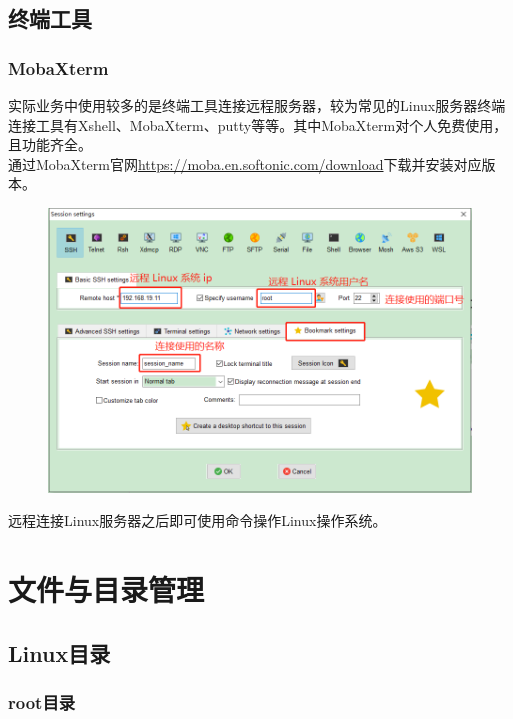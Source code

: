 \documentclass[12pt, openany, oneside]{book}
\begin{document}
\newpage

\section{终端工具}

\subsection{MobaXterm}

实际业务中使用较多的是终端工具连接远程服务器，较为常见的Linux服务器终端连接工具有Xshell、MobaXterm、putty等等。其中MobaXterm对个人免费使用，且功能齐全。\\

通过MobaXterm官网\url{https://moba.en.softonic.com/download}下载并安装对应版本。

\begin{figure}[H]
    \centering
    \includegraphics[scale=0.4]{img/Chapter1/1-5/1.png}
\end{figure}

远程连接Linux服务器之后即可使用命令操作Linux操作系统。\\

\newpage

\chapter{文件与目录管理}

\section{Linux目录}

\subsection{root目录}
\end{document}

